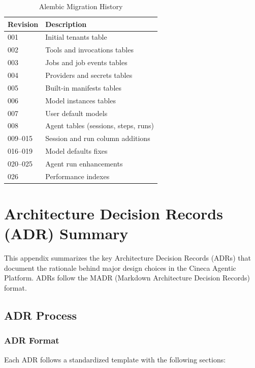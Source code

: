 \documentclass[a4paper,twoside]{sapthesis}
\begin{document}
\begin{table}[ht]
\centering
\caption{Alembic Migration History}
\label{tab:migrations}
\small
\begin{tabularx}{\textwidth}{lX}
    \hline
    \textbf{Revision} & \textbf{Description} \\
    \hline
    001 & Initial tenants table \\
    002 & Tools and invocations tables \\
    003 & Jobs and job events tables \\
    004 & Providers and secrets tables \\
    005 & Built-in manifests tables \\
    006 & Model instances tables \\
    007 & User default models \\
    008 & Agent tables (sessions, steps, runs) \\
    009--015 & Session and run column additions \\
    016--019 & Model defaults fixes \\
    020--025 & Agent run enhancements \\
    026 & Performance indexes \\
    \hline
\end{tabularx}
\end{table}


\chapter{Architecture Decision Records (ADR) Summary}
\label{app:adr-summary}

This appendix summarizes the key Architecture Decision Records (ADRs) that document the rationale behind major design choices in the Cineca Agentic Platform. ADRs follow the MADR (Markdown Architecture Decision Records) format.

\section{ADR Process}
\label{app:adr:process}

\subsection{ADR Format}

Each ADR follows a standardized template with the following sections:
\end{document}
